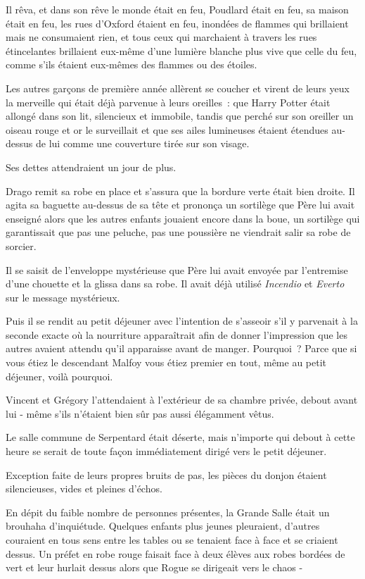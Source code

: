 Il rêva, et dans son rêve le monde était en feu, Poudlard était en feu, sa maison était en feu, les rues d'Oxford étaient en feu, inondées de flammes qui brillaient mais ne consumaient rien, et tous ceux qui marchaient à travers les rues étincelantes brillaient eux-même d'une lumière blanche plus vive que celle du feu, comme s'ils étaient eux-mêmes des flammes ou des étoiles.

Les autres garçons de première année allèrent se coucher et virent de leurs yeux la merveille qui était déjà parvenue à leurs oreilles~: que Harry Potter était allongé dans son lit, silencieux et immobile, tandis que perché sur son oreiller un oiseau rouge et or le surveillait et que ses ailes lumineuses étaient étendues au-dessus de lui comme une couverture tirée sur son visage.

Ses dettes attendraient un jour de plus.


Drago remit sa robe en place et s'assura que la bordure verte était bien droite. Il agita sa baguette au-dessus de sa tête et prononça un sortilège que Père lui avait enseigné alors que les autres enfants jouaient encore dans la boue, un sortilège qui garantissait que pas une peluche, pas une poussière ne viendrait salir sa robe de sorcier.

Il se saisit de l'enveloppe mystérieuse que Père lui avait envoyée par l'entremise d'une chouette et la glissa dans sa robe. Il avait déjà utilisé \emph{Incendio} et \emph{Everto} sur le message mystérieux.

Puis il se rendit au petit déjeuner avec l'intention de s'asseoir s'il y parvenait à la seconde exacte où la nourriture apparaîtrait afin de donner l'impression que les autres avaient attendu qu'il apparaisse avant de manger. Pourquoi~? Parce que si vous étiez le descendant Malfoy vous étiez premier en tout, même au petit déjeuner, voilà pourquoi.

Vincent et Grégory l'attendaient à l'extérieur de sa chambre privée, debout avant lui - même s'ils n'étaient bien sûr pas aussi élégamment vêtus.

Le salle commune de Serpentard était déserte, mais n'importe qui debout à cette heure se serait de toute façon immédiatement dirigé vers le petit déjeuner.

Exception faite de leurs propres bruits de pas, les pièces du donjon étaient silencieuses, vides et pleines d'échos.

En dépit du faible nombre de personnes présentes, la Grande Salle était un brouhaha d'inquiétude. Quelques enfants plus jeunes pleuraient, d'autres couraient en tous sens entre les tables ou se tenaient face à face et se criaient dessus. Un préfet en robe rouge faisait face à deux élèves aux robes bordées de vert et leur hurlait dessus alors que Rogue se dirigeait vers le chaos -

